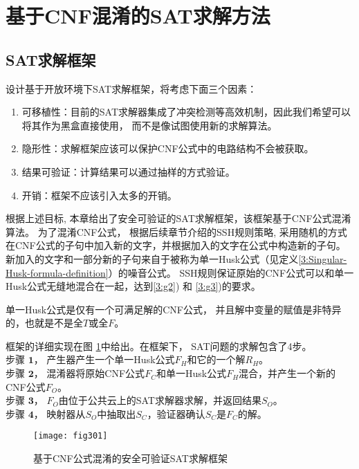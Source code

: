 \section{基于CNF混淆的SAT求解方法}

\subsection{SAT求解框架}
设计基于开放环境下SAT求解框架，将考虑下面三个因素：

\begin{enumerate}
 \item 可移植性：目前的SAT求解器集成了冲突检测等高效机制，因此我们希望可以将其作为黑盒直接使用，
 而不是像\cite{OBfuscationd-CNFs}试图使用新的求解算法。
 \item \label{3:g2} 隐形性\cite{obfuscationBible}：求解框架应该可以保护CNF公式中的电路结构不会被获取。
\item 结果可验证：计算结果可以通过抽样的方式验证。
 \item \label{3:g3} 开销：框架不应该引入太多的开销。
\end{enumerate}

根据上述目标,
本章给出了安全可验证的SAT求解框架，该框架基于CNF公式混淆算法。
为了混淆CNF公式，
根据后续章节介绍的SSH规则策略,
采用随机的方式在CNF公式的子句中加入新的文字，并根据加入的文字在公式中构造新的子句。
新加入的文字和一部分新的子句来自于被称为单一Husk公式（见定义\ref{3:Singular-Husk-formula-definition}）的噪音公式。
SSH规则保证原始的CNF公式可以和单一Husk公式无缝地混合在一起，达到\ref{3:g2}) 和 \ref{3:g3})的要求。

\begin{definition}[单一Husk公式]\label{3:Singular-Husk-formula-definition}
单一Husk公式是仅有一个可满足解的CNF公式，
并且解中变量的赋值是非特异的，也就是不是全$T$或全$F$。
\end{definition}

框架的详细实现在图 \ref{3:fig_cldSAT}中给出。在框架下， SAT问题的求解包含了4步。\\
$\textbf{步骤 1}$， 产生器产生一个单一Husk公式$F_H$和它的一个解$R_H$。\\
$\textbf{步骤 2}$， 混淆器将原始CNF公式$F_C$和单一Husk公式$F_H$混合，并产生一个新的CNF公式$F_O$。\\
$\textbf{步骤 3}$， $F_O$由位于公共云上的SAT求解器求解，并返回结果$S_O$。\\
$\textbf{步骤 4}$， 映射器从$S_O$中抽取出$S_C$，验证器确认$S_C$是$F_C$的解。
\begin{figure}
\footnotesize\centering
\centerline{\texttt{[image: fig301]}}
\caption{基于CNF公式混淆的安全可验证SAT求解框架}
\label{3:fig_cldSAT}
\end{figure}

